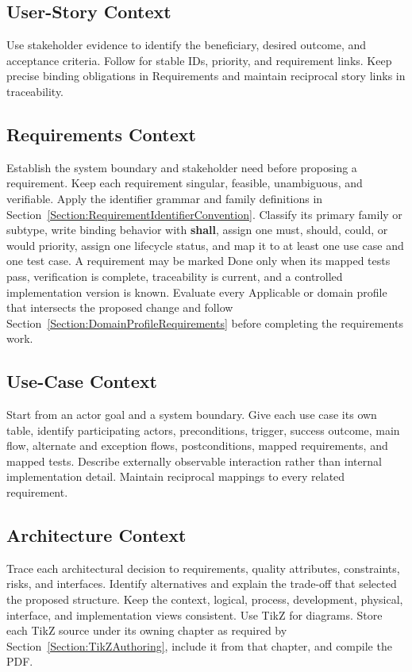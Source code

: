 \subsection{User-Story Context}
\label{Section:AIUserStoryContext}
Use stakeholder evidence to identify the beneficiary, desired outcome, and
acceptance criteria. Follow  for stable IDs, priority,
and requirement links. Keep precise binding obligations in Requirements and
maintain reciprocal story links in traceability.

\subsection{Requirements Context}
\label{Section:AIRequirementsContext}
Establish the system boundary and stakeholder need before proposing a
requirement. Keep each requirement singular, feasible, unambiguous, and
verifiable. Apply the identifier grammar and family definitions in
Section~\ref{Section:RequirementIdentifierConvention}. Classify its primary
family or subtype, write binding behavior with
\textbf{shall}, assign one \gls{must}, \gls{should}, \gls{could}, or
\gls{would} priority, assign one lifecycle status, and map it to at least one
use case and one test case. A requirement may be marked Done only when its
mapped tests pass, verification is complete, traceability is current, and a
controlled implementation version is known. Evaluate every Applicable or \OwnedTBD{}
domain profile that intersects the proposed change and follow
Section~\ref{Section:DomainProfileRequirements} before completing the
requirements work.

\subsection{Use-Case Context}
\label{Section:AIUseCaseContext}
Start from an actor goal and a system boundary. Give each use case its own
table, identify participating actors, preconditions, trigger, success outcome,
main flow, alternate and exception flows, postconditions, mapped requirements,
and mapped tests. Describe externally observable interaction rather than
internal implementation detail. Maintain reciprocal mappings to every related
requirement.

\subsection{Architecture Context}
\label{Section:AIArchitectureContext}
Trace each architectural decision to requirements, quality attributes,
constraints, risks, and interfaces. Identify alternatives and explain the
trade-off that selected the proposed structure. Keep the context, logical,
process, development, physical, interface, and implementation views consistent.
Use TikZ for diagrams.
Store each TikZ source under its owning chapter as required by
Section~\ref{Section:TikZAuthoring}, include it from that chapter, and compile
the PDF.

